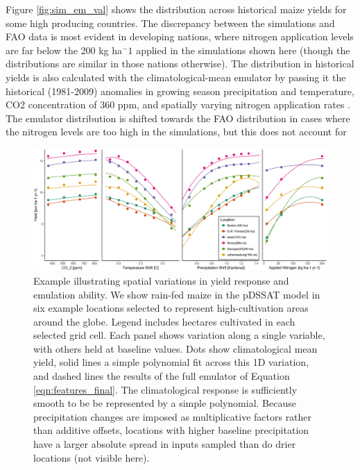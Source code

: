 \documentclass[preprint, 5p, times, twocolumn]{elsarticle}
\begin{document}
{Figure \ref{fig:sim_em_val} shows the distribution across historical maize yields for some high producing countries. The discrepancy between the simulations and FAO data is most evident in developing nations, where nitrogen application levels are far below the 200 kg ha$^-1$ applied in the simulations shown here (though the distributions are similar in those nations otherwise). The distribution in historical yields is also calculated with the climatological-mean emulator by passing it the historical (1981-2009) anomalies in growing season precipitation and temperature, CO2 concentration of 360 ppm, and spatially varying nitrogen application rates \citep[data from:~][]{potter2010, Mueller2012}. The emulator distribution is shifted towards the FAO distribution in cases where the nitrogen levels are too high in the simulations, but this does not account for 


\begin{figure}[!h]
\centering
    \includegraphics[width=0.95\linewidth]{figures/regression_areas.png}
    \caption{Example illustrating spatial variations in yield response and emulation ability. We show rain-fed maize in the pDSSAT model in six example locations selected to represent high-cultivation areas around the globe. Legend includes hectares cultivated in each selected grid cell. Each panel shows variation along a single variable, with others held at baseline values. Dots show climatological mean yield, solid lines a simple polynomial fit across this 1D variation, and dashed lines the results of the full emulator of Equation \ref{eqn:features_final}. The climatological response is sufficiently smooth to be be represented by a simple polynomial. Because precipitation changes are imposed as multiplicative factors rather than additive offsets, locations with higher baseline precipitation have a larger absolute spread in inputs sampled than do drier locations (not visible here).}
   \label{fig:regression}
\end{figure}

}
\end{document}
